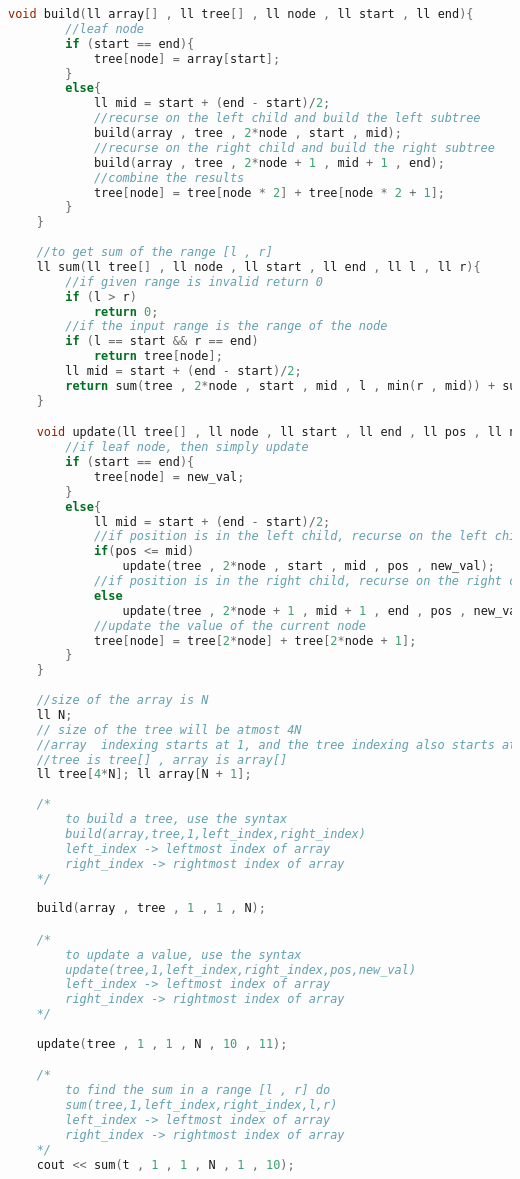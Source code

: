 \documentclass[12pt,a4paper]{amsart}
\numberwithin{equation}{section}
\theoremstyle{definition}
\begin{document}
\begin{lstlisting}[language=C++]
    void build(ll array[] , ll tree[] , ll node , ll start , ll end){
        //leaf node
        if (start == end){
            tree[node] = array[start];
        }
        else{
            ll mid = start + (end - start)/2;
            //recurse on the left child and build the left subtree
            build(array , tree , 2*node , start , mid);
            //recurse on the right child and build the right subtree
            build(array , tree , 2*node + 1 , mid + 1 , end);
            //combine the results
            tree[node] = tree[node * 2] + tree[node * 2 + 1];
        }
    }
    
    //to get sum of the range [l , r]
    ll sum(ll tree[] , ll node , ll start , ll end , ll l , ll r){
        //if given range is invalid return 0
        if (l > r)
            return 0;
        //if the input range is the range of the node
        if (l == start && r == end)
            return tree[node];
        ll mid = start + (end - start)/2;
        return sum(tree , 2*node , start , mid , l , min(r , mid)) + sum(tree , 2*node + 1 , mid + 1 , end , max(l , mid + 1) , r);
    }

    void update(ll tree[] , ll node , ll start , ll end , ll pos , ll new_val){
        //if leaf node, then simply update
        if (start == end){
            tree[node] = new_val;
        }
        else{
            ll mid = start + (end - start)/2;
            //if position is in the left child, recurse on the left child
            if(pos <= mid)
                update(tree , 2*node , start , mid , pos , new_val);
            //if position is in the right child, recurse on the right child
            else
                update(tree , 2*node + 1 , mid + 1 , end , pos , new_val);
            //update the value of the current node
            tree[node] = tree[2*node] + tree[2*node + 1];
        }
    }
    
    //size of the array is N
    ll N; 
    // size of the tree will be atmost 4N
    //array  indexing starts at 1, and the tree indexing also starts at 1
    //tree is tree[] , array is array[]
    ll tree[4*N]; ll array[N + 1];
    
    /*
        to build a tree, use the syntax
        build(array,tree,1,left_index,right_index)
        left_index -> leftmost index of array
        right_index -> rightmost index of array
    */
    
    build(array , tree , 1 , 1 , N);

    /*
        to update a value, use the syntax
        update(tree,1,left_index,right_index,pos,new_val)
        left_index -> leftmost index of array
        right_index -> rightmost index of array
    */
    
    update(tree , 1 , 1 , N , 10 , 11);

    /*
        to find the sum in a range [l , r] do
        sum(tree,1,left_index,right_index,l,r)
        left_index -> leftmost index of array
        right_index -> rightmost index of array
    */
    cout << sum(t , 1 , 1 , N , 1 , 10);
\end{lstlisting}
\end{document}
